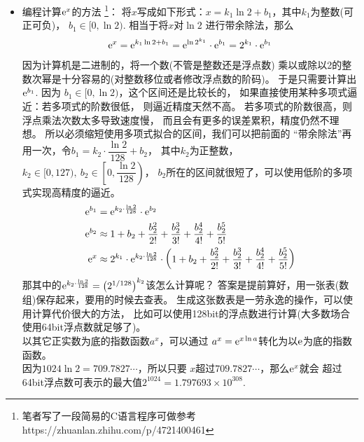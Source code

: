 \begin{itemize}[leftmargin=\inteval{\myitemleftmargin}pt,itemsep=
   \inteval{\myitemitempsep}pt,topsep=\inteval{\myitemtopsep}pt]
\item 编程计算$ \mathrm{e}^x $的方法
\footnote{笔者写了一段简易的C语言程序可做参考
    https://zhuanlan.zhihu.com/p/4721400461}：
将$ x $写成如下形式：$ x=k_1\ln2 +b_1 $，其中$ k_1 $为整数(可正可负)，
$ b_1\in[0,\ln2) $. 相当于将$ x $对$ \ln2 $
进行带余除法，那么
\begin{align*}
    \mathrm{e}^x=\mathrm{e}^{k_1\ln2 +b_1}=\mathrm{e}^{\ln2^{k_1}}\cdot \mathrm{e}^{b_1}=
    2^{k_1}\cdot \mathrm{e}^{b_1}
\end{align*}
因为计算机是二进制的，将一个数(不管是整数还是浮点数)
乘以或除以2的整数次幂是十分容易的(对整数移位或者修改浮点数的阶码)。
于是只需要计算出$ \mathrm{e}^{b_1} $. 因为
$ b_1\in[0,\ln2) $，这个区间还是比较长的，
如果直接使用某种多项式逼近：若多项式的阶数很低，
则逼近精度天然不高。
若多项式的阶数很高，则浮点乘法次数太多导致速度慢，
而且会有更多的误差累积，精度仍然不理想。
所以必须缩短使用多项式拟合的区间，我们可以把前面的
“带余除法”再用一次，令$ b_1=k_2\cdot \dfrac{\ln2}{128}+b_2 $，
其中$ k_2 $为正整数，$ k_2\in[0,127),\ 
b_2\in\left[0,\dfrac{\ln2}{128}\right)$，
$ b_2 $所在的区间就很短了，可以使用低阶的多项式实现高精度的逼近。
\begin{align*}
    \mathrm{e}^{b_1}&=\mathrm{e}^{k_2\cdot\frac{\ln2}{128}}\cdot \mathrm{e}^{b_2} \\
    \mathrm{e}^{b_2}&\approx 1+b_2+\frac{b_2^2}{2!}+\frac{b_2^3}{3!}
    +\frac{b_2^4}{4!}+\frac{b_2^5}{5!} \\
    \mathrm{e}^x&\approx 2^{k_1}\cdot \mathrm{e}^{k_2\cdot\frac{\ln2}{128}}
    \cdot\left(1+b_2+\frac{b_2^2}{2!}+\frac{b_2^3}{3!}
    +\frac{b_2^4}{4!}+\frac{b_2^5}{5!} \right)
\end{align*}
那其中的$ \mathrm{e}^{k_2\cdot\frac{\ln2}{128}}=
\left(2^{1/128}\right)^{k_2} $该怎么计算呢？
答案是提前算好，用一张表(数组)保存起来，要用的时候去查表。
生成这张数表是一劳永逸的操作，可以使用计算代价很大的方法，
比如可以使用128bit的浮点数进行计算(大多数场合
使用64bit浮点数就足够了)。\\
以其它正实数为底的指数函数$ a^x $，可以通过
$ a^x=\mathrm{e}^{x\ln a} $转化为以$ \mathrm{e} $为底的指数函数。\\
因为$ 1024\ln 2=709.7827\cdots $，所以只要
$ x $超过$ 709.7827\cdots $，那么$ \mathrm{e}^x $就会
超过64bit浮点数可表示的最大值$ 2^{1024}=1.797693\times10^{308} $.


\end{itemize}
